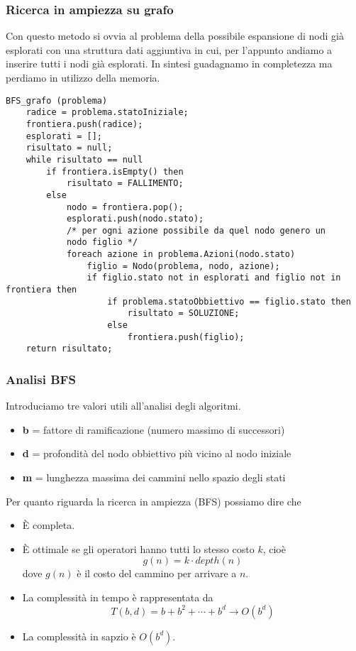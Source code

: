 \subsubsection{Ricerca in ampiezza su grafo}
Con questo metodo si ovvia al problema della possibile espansione di nodi gi\`a esplorati
con una struttura dati aggiuntiva in cui, per l'appunto andiamo a inserire tutti i nodi
gi\`a esplorati. In sintesi guadagnamo in completezza ma perdiamo in utilizzo della memoria.
\begin{lstlisting}[style=pseudo-style]
BFS_grafo (problema)
	radice = problema.statoIniziale;
	frontiera.push(radice);
	esplorati = [];
	risultato = null;
	while risultato == null
		if frontiera.isEmpty() then
			risultato = FALLIMENTO;
		else
			nodo = frontiera.pop();
			esplorati.push(nodo.stato);
			/* per ogni azione possibile da quel nodo genero un 
			nodo figlio */
			foreach azione in problema.Azioni(nodo.stato)
				figlio = Nodo(problema, nodo, azione);
				if figlio.stato not in esplorati and figlio not in frontiera then
					if problema.statoObbiettivo == figlio.stato then
						risultato = SOLUZIONE;
					else
						frontiera.push(figlio);
	return risultato;
\end{lstlisting}

\subsubsection{Analisi BFS}
Introduciamo tre valori utili all'analisi degli algoritmi.
\begin{itemize}
	\item \textbf b = fattore di ramificazione (numero massimo di successori)
	\item \textbf d = profondit\`a del nodo obbiettivo pi\`u vicino al nodo iniziale
	\item \textbf m = lunghezza massima dei cammini nello spazio degli stati
\end{itemize}
Per quanto riguarda la ricerca in ampiezza (BFS) possiamo dire che
\begin{itemize}
	\item \`E completa.
	\item \`E ottimale se gli operatori hanno tutti lo stesso costo $k$, cio\`e
	      \[ g(n) = k \cdot depth(n) \]
	      dove $g(n)$ \`e il costo del cammino per arrivare a $n$.
	\item La complessit\`a in tempo \`e rappresentata da
	      \[ T(b, d) = b + b^2 + \cdots + b^d \rightarrow O(b^d) \]
	\item La complessit\`a in sapzio \`e $O(b^d)$.
\end{itemize}

